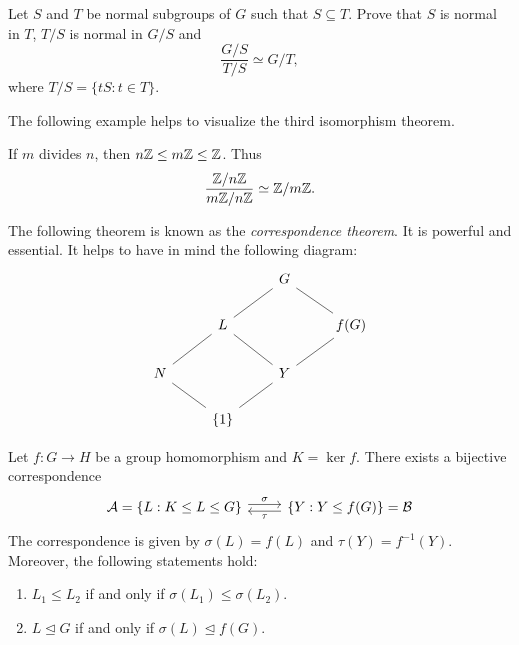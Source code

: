 \begin{exercise}
\label{xca:third}
Let $S$ and $T$ be normal subgroups of $G$ such that 
$S\subseteq T$. Prove that $S$ is normal in $T$, 
$T/S$ is normal in $G/S$ and 
\[
\frac{G/S}{T/S}\simeq G/T,
\]
where $T/S=\{tS:t\in T\}$.
\end{exercise}

The following example helps to visualize the third isomorphism
theorem. 

\begin{example}
If $m$ divides $n$, then $n\mathbb{Z}\leq m\mathbb{Z}\leq\mathbb{Z}$. Thus 
\[
\frac{\mathbb{Z}/n\mathbb{Z}}{m\mathbb{Z}/n\mathbb{Z}}\simeq\mathbb{Z}/m\mathbb{Z}.
\]
\end{example}

The following theorem is known as the \emph{correspondence theorem}.
It is powerful and essential. It helps to have in mind the following diagram: 
\[
\begin{tikzcd}
        && G \\
        & L && {f(G)} \\
        N && Y \\
        & {\{1\}}
        \arrow[no head, from=1-3, to=2-4]
        \arrow[no head, from=1-3, to=2-2]
        \arrow[no head, from=2-2, to=3-1]
        \arrow[no head, from=3-1, to=4-2]
        \arrow[no head, from=2-2, to=3-3]
        \arrow[no head, from=3-3, to=4-2]
        \arrow[no head, from=2-4, to=3-3]
\end{tikzcd}
\]

\begin{theorem}
Let $f\colon G\to H$ be a group homomorphism and $K=\ker f$. There exists
a bijective correspondence 
\[\begin{tikzcd}
        {\mathcal{A}=\{L:K\leq L\leq G\}} & {\{Y:Y\leq f(G)\}=\mathcal{B}}
        \arrow["\sigma", shift left=1, from=1-1, to=1-2]
        \arrow["\tau", shift left=1, from=1-2, to=1-1]
\end{tikzcd}
\]
The correspondence is given by $\sigma(L)=f(L)$ and $\tau(Y)=f^{-1}(Y)$. Moreover, the following statements hold: 
\begin{enumerate}
\item $L_1\leq L_2$ if and only if $\sigma(L_1)\leq \sigma(L_2)$.
\item $L\unlhd G$ if and only if $\sigma(L)\unlhd f(G)$.
\end{enumerate}
\end{theorem}


